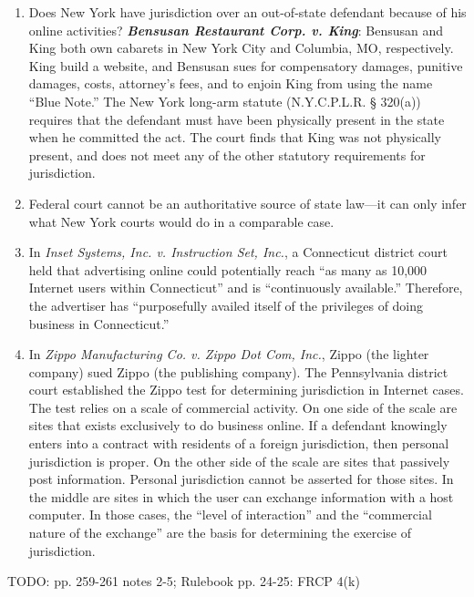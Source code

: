 \begin{enumerate}
    \item Does New York have jurisdiction over an out-of-state defendant 
    because of his online activities? \textbf{\emph{Bensusan Restaurant Corp.  
    v. King}}: Bensusan and King both own cabarets in New York City and 
    Columbia, MO, respectively. King build a website, and Bensusan sues for 
    compensatory damages, punitive damages, costs, attorney's fees, and to 
    enjoin King from using the name ``Blue Note.'' The New York long-arm 
    statute (N.Y.C.P.L.R. § 320(a)) requires that the defendant must have been 
    physically present in the state when he committed the act. The court finds 
    that King was not physically present, and does not meet any of the other 
    statutory requirements for jurisdiction.
    \item Federal court cannot be an authoritative source of state law---it 
    can only infer what New York courts would do in a comparable case.
    \item In \emph{Inset Systems, Inc. v. Instruction Set, Inc.}, a 
    Connecticut district court held that advertising online could potentially 
    reach ``as many as 10,000 Internet users within Connecticut'' and is 
    ``continuously available.'' Therefore, the advertiser has ``purposefully 
    availed itself of the privileges of doing business in Connecticut.''
    \item In \emph{Zippo Manufacturing Co. v. Zippo Dot Com, Inc.}, Zippo (the 
    lighter company) sued Zippo (the publishing company). The Pennsylvania 
    district court established the Zippo test for determining jurisdiction in 
    Internet cases. The test relies on a scale of commercial activity. On one 
    side of the scale are sites that exists exclusively to do business online.  
    If a defendant knowingly enters into a contract with residents of a 
    foreign jurisdiction, then personal jurisdiction is proper. On the other 
    side of the scale are sites that passively post information. Personal 
    jurisdiction cannot be asserted for those sites. In the middle are sites 
    in which the user can exchange information with a host computer. In those 
    cases, the ``level of interaction'' and the ``commercial nature of the 
    exchange'' are the basis for determining the exercise of jurisdiction.  
    \end{enumerate}

TODO: pp. 259-261 notes 2-5; Rulebook pp. 24-25: FRCP 4(k)

